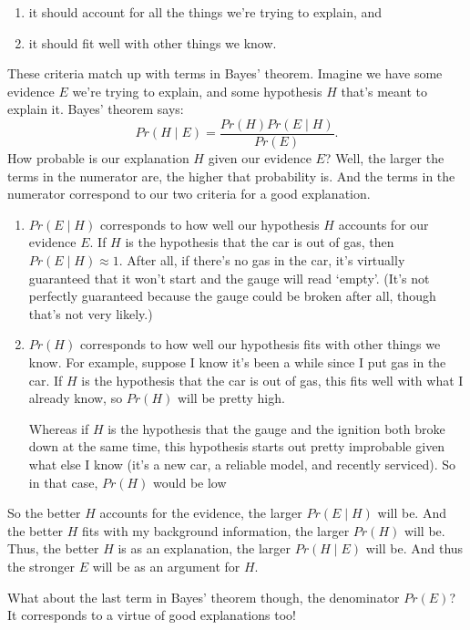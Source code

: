 \documentclass[justified]{tufte-book}
\providecommand{\tightlist}{%
  \setlength{\itemsep}{0pt}\setlength{\parskip}{0pt}}
\newcommand{\given}{\mid}
\newcommand{\p}{Pr}
\theoremstyle{definition}
\theoremstyle{definition}
\theoremstyle{definition}
\theoremstyle{remark}
\begin{document}
\begin{enumerate}
\def\labelenumi{\arabic{enumi}.}
\tightlist
\item
  it should account for all the things we're trying to explain, and
\item
  it should fit well with other things we know.
\end{enumerate}

These criteria match up with terms in Bayes' theorem. Imagine we have some evidence \(E\) we're trying to explain, and some hypothesis \(H\) that's meant to explain it. Bayes' theorem says:
\[ \p(H \given E) = \frac{\p(H)\p(E \given H)}{\p(E)}. \]
How probable is our explanation \(H\) given our evidence \(E\)? Well, the larger the terms in the numerator are, the higher that probability is. And the terms in the numerator correspond to our two criteria for a good explanation.

\begin{enumerate}
\def\labelenumi{\arabic{enumi}.}
\item
  \(\p(E \given H)\) corresponds to how well our hypothesis \(H\) accounts for our evidence \(E\). If \(H\) is the hypothesis that the car is out of gas, then \(\p(E \given H) \approx 1\). After all, if there's no gas in the car, it's virtually guaranteed that it won't start and the gauge will read `empty'. (It's not perfectly guaranteed because the gauge could be broken after all, though that's not very likely.)
\item
  \(\p(H)\) corresponds to how well our hypothesis fits with other things we know. For example, suppose I know it's been a while since I put gas in the car. If \(H\) is the hypothesis that the car is out of gas, this fits well with what I already know, so \(\p(H)\) will be pretty high.

  Whereas if \(H\) is the hypothesis that the gauge and the ignition both broke down at the same time, this hypothesis starts out pretty improbable given what else I know (it's a new car, a reliable model, and recently serviced). So in that case, \(\p(H)\) would be low
\end{enumerate}

So the better \(H\) accounts for the evidence, the larger \(\p(E \given H)\) will be. And the better \(H\) fits with my background information, the larger \(\p(H)\) will be. Thus, the better \(H\) is as an explanation, the larger \(\p(H \given E)\) will be. And thus the stronger \(E\) will be as an argument for \(H\).

What about the last term in Bayes' theorem though, the denominator \(\p(E)\)? It corresponds to a virtue of good explanations too!
\end{document}
